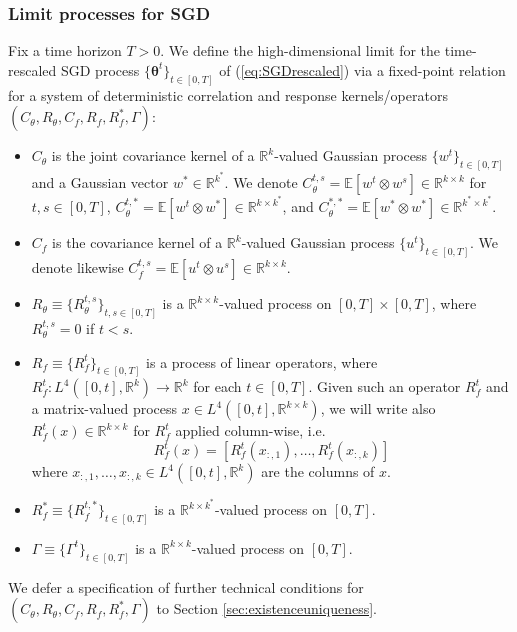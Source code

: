 \documentclass[11pt,letterpaper,reqno]{amsart}
\theoremstyle{definition}
\def\E{\mathbb{E}}
\def\R{\mathbb{R}}
\def\btheta{\boldsymbol{\theta}}
\begin{document}
\subsubsection{Limit processes for SGD}\label{sec:DMFT-SGD}
Fix a time horizon $T>0$. We define the high-dimensional limit
for the time-rescaled SGD process $\{\btheta^t\}_{t \in [0,T]}$
of (\ref{eq:SGDrescaled}) via a fixed-point relation
for a system of deterministic correlation and response kernels/operators
$(C_\theta,R_\theta,C_f,R_f,R_f^*,\Gamma)$:
\begin{itemize}
\item $C_\theta$ is the joint covariance kernel of a $\R^k$-valued Gaussian
process $\{w^t\}_{t \in [0,T]}$ and a Gaussian vector $w^* \in \R^{k^*}$.
We denote $C_\theta^{t,s}=\E[w^t \otimes w^s] \in \R^{k \times k}$
for $t,s \in [0,T]$,
$C_\theta^{t,*}=\E[w^t \otimes w^*] \in \R^{k \times k^*}$,
and $C_\theta^{*,*}=\E[w^* \otimes w^*] \in \R^{k^* \times k^*}$.
\item $C_f$ is the covariance kernel of a $\R^k$-valued Gaussian process
$\{u^t\}_{t \in [0,T]}$. We denote likewise
$C_f^{t,s}=\E[u^t \otimes u^s] \in \R^{k \times k}$.
\item $R_\theta \equiv \{R_\theta^{t,s}\}_{t,s \in [0,T]}$ is a $\R^{k \times
k}$-valued process on $[0,T] \times [0,T]$,
where $R_\theta^{t,s}=0$ if $t<s$.
\item $R_f \equiv \{R_f^t\}_{t \in [0,T]}$ is a process of linear operators,
where $R_f^t:L^4([0,t],\R^k) \to \R^k$ for each $t \in [0,T]$.
Given such an operator $R_f^t$ and a matrix-valued process
$x \in L^4([0,t],\R^{k \times k})$, we will write also
$R_f^t(x) \in \R^{k \times k}$ for $R_f^t$ applied column-wise, i.e.\
\begin{equation}\label{eq:matrixRf}
R_f^t(x)=[R_f^t(x_{:,1}),\ldots,R_f^t(x_{:,k})]
\end{equation}
where $x_{:,1},\ldots,x_{:,k} \in L^4([0,t],\R^k)$ are the columns of $x$.
\item $R_f^* \equiv \{R_f^{t,*}\}_{t \in [0,T]}$ is a $\R^{k \times k^*}$-valued
process on $[0,T]$.
\item $\Gamma \equiv \{\Gamma^t\}_{t \in [0,T]}$ is a $\R^{k \times k}$-valued
process on $[0,T]$.
\end{itemize}
We defer a specification of further technical conditions for
$(C_\theta,R_\theta,C_f,R_f,R_f^*,\Gamma)$ to Section
\ref{sec:existenceuniqueness}.
\end{document}
